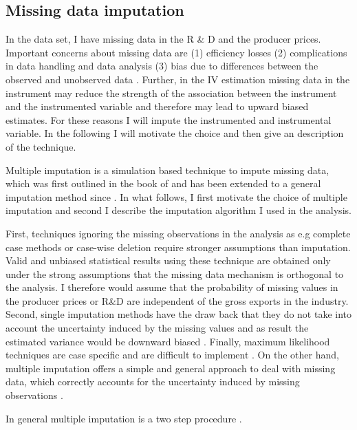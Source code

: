 \subsection{Missing data imputation}
 In the data set, I have missing data in the R \& D and the producer prices. Important concerns about missing data are (1) efficiency losses (2) complications in data handling and data analysis (3) bias due to differences between the observed and unobserved data \textcite{schafer1998multiple}. Further, in the IV estimation missing data in the instrument may reduce the strength of the association between the instrument and the instrumented variable and therefore may lead to upward biased estimates. For these reasons I will impute the instrumented and instrumental variable. In the following I will  motivate the choice and then give an description of the technique.  \par
Multiple imputation is a simulation based technique to impute missing data, which was first outlined in the book of \textcite{Rubin1987} and has been extended to a general imputation method since  \parencite{schafer1998multiple}. 
In what follows, I first motivate the choice of multiple imputation and second I describe the imputation algorithm I used in the analysis. \par 
First, techniques  ignoring the missing observations in the analysis as e.g complete case methods or case-wise deletion require stronger assumptions than imputation. Valid and unbiased statistical results using these technique  are obtained only under the strong assumptions that the missing data mechanism is orthogonal to the analysis. 
I therefore would assume that the probability of  missing values in the producer prices or R\&D are independent of the gross exports in the industry.  
Second, single imputation methods have the draw back that they do not take into account the uncertainty induced by the missing values and as result the estimated variance would be downward biased \parencite{Wooldridge} .  
Finally, maximum likelihood techniques are case specific and are difficult to implement \parencite{schafer1998multiple}.
On the other hand,  multiple imputation offers a  simple and general approach to deal with missing data, which correctly accounts for the uncertainty induced by missing observations \parencite{schafer1998multiple}. \par
 In general multiple imputation is a two step procedure \parencite{brownstone2001mi}. 
